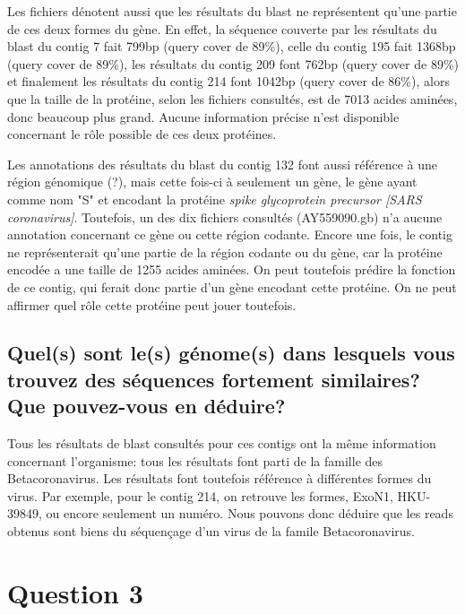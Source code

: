 \documentclass[11pt]{article} %
\begin{document}
Les fichiers dénotent aussi que les résultats du blast ne représentent qu'une partie de ces deux formes du gène. En effet,
la séquence couverte par les résultats du blast du contig 7 fait 799bp (query cover de 89\%), celle du contig 195 fait
1368bp (query cover de 89\%), les résultats du contig 209 font 762bp (query cover de 89\%) et finalement les résultats du
contig 214 font 1042bp (query cover de 86\%), alors que la taille de la protéine, selon les fichiers consultés, est de
7013 acides aminées, donc beaucoup plus grand. Aucune information précise n'est disponible concernant le rôle possible
de ces deux protéines.

Les annotations des résultats du blast du contig 132 font aussi référence à une région génomique (?), mais cette fois-ci
à seulement un gène, le gène ayant comme nom "S" et encodant la protéine \emph{spike glycoprotein precursor [SARS coronavirus]}.
Toutefois, un des dix fichiers consultés (AY559090.gb) n'a aucune annotation concernant ce gène ou cette région codante.
Encore une fois, le contig ne représenterait qu'une partie de la région codante ou du gène, car la protéine encodée a une
taille de 1255 acides aminées. On peut toutefois prédire la fonction de ce contig, qui ferait donc partie d'un gène encodant
cette protéine. On ne peut affirmer quel rôle cette protéine peut jouer toutefois.

\subsection[Génome des séquences fortement similaires]{Quel(s) sont le(s) génome(s) dans lesquels vous trouvez des séquences
fortement similaires? Que pouvez-vous en déduire?}

Tous les résultats de blast consultés pour ces contigs ont la même information concernant l'organisme: tous les résultats
font parti de la famille des Betacoronavirus. Les résultats font toutefois référence à différentes formes du virus. Par exemple,
pour le contig 214, on retrouve les formes, ExoN1, HKU-39849, ou encore seulement un numéro. Nous pouvons donc déduire que
les reads obtenus sont biens du séquençage d'un virus de la famile Betacoronavirus.

 
\section{Question 3} %
\end{document}
